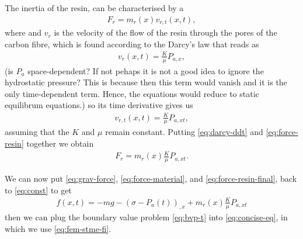 \documentclass[twoside,a4paper,12pt]{article}
\newcommand{\note}[1]{{\color{red}\newline(#1)}}
\newcommand{\+}[2]{\newcommand#1{{\color{\notcolor}#2}}}
\newcommand{\1}[2]{\newcommand{#1}[1]{{\color{\notcolor}#2}}}
\newcommand{\2}[2]{\newcommand{#1}[2]{{\color{\notcolor}#2}}}
\begin{document}
The inertia of the resin, can be characterised by a
%
\begin{align}
    F_r = m_r(x) v_{r,t}(x,t), \label{eq:force-resin}
\end{align}
%
where and $v_r$ is the velocity of the flow of the resin through the
pores of the carbon fibre, which is found according to the Darcy's law
that reads as
%
\begin{align}
  v_r(x,t) = \frac{K}{\mu} P_{a,x}, \label{eq:darcy}
\end{align}
%
\note{is $P_a$ space-dependent? If not pehaps it is not a good idea to
  ignore the hydrostatic pressure? This is because then this term
  would vanish and it is the only time-dependent term. Hence, the
  equations would reduce to static equilibrum equations.}
%
so its time derivative gives us
\begin{align}
  v_{r,t}(x,t) = \frac{K}{\mu} P_{a,xt}, \label{eq:darcy-ddt}
\end{align}
assuming that the $K$ and $\mu$ remain constant.
%
Putting \eqref{eq:darcy-ddt} and \eqref{eq:force-resin} together we obtain
%
\begin{align}
  F_r = m_r(x) \frac{K}{\mu} P_{a,xt} \label{eq:force-resin-final}.
\end{align}

We can now put \eqref{eq:grav-force}, \eqref{eq:force-material}, and
\eqref{eq:force-resin-final}, back to \eqref{eq:const}  to get
%
\begin{align}
  f(x,t) = - m g - (\sigma -  P_a(t))_{,x}  +m_r(x) \frac{K}{\mu} P_{a,xt}
\end{align}
%
then we can plug the boundary value problem \eqref{eq:bvp-t} into
\eqref{eq:concise-eq}, in which we use \eqref{eq:fem-stme-fi}.
\end{document}
